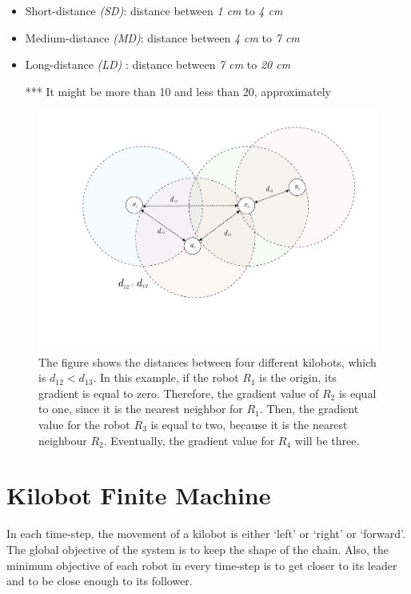 \documentclass[11pt,a4paper]{article}
\begin{document}
\begin{itemize}
    \item Short-distance \textit{(SD)}: distance between \textit{1 cm} to \textit{4 cm}
    \item Medium-distance \textit{(MD)}: distance between \textit{4 cm} to \textit{7 cm}
    \item Long-distance \textit{(LD)} : distance between \textit{7 cm} to \textit{20 cm} 
   
    *** It might be more than 10 and less than 20, approximately  
    
\end{itemize}
 \begin{figure}[h]
     \centering
 \includegraphics[scale=0.4]{Figs/PropagationArea_BW.pdf}
     \caption{ The figure shows the distances between four different kilobots, which is \(d_{12}<d_{13}\). In this example, if the robot $R_1$ is the origin, its gradient is equal to zero.  Therefore, the gradient value of $R_2$ is equal to one, since it is the nearest neighbor for $R_1$. Then, the gradient value for the robot $R_3$ is equal to two, because it is the nearest neighbour $R_2$. Eventually, the gradient value for $R_4$ will be three.  }
     \label{fig:propagation}
  \end{figure}
\section {Kilobot Finite Machine }
In each time-step, the movement of a kilobot is either `left' or `right' or `forward'. The global objective of the system is to keep the shape of the chain. Also, the minimum objective of each robot in every time-step is to get closer to its leader and to be close enough to its follower.  
\end{document}
